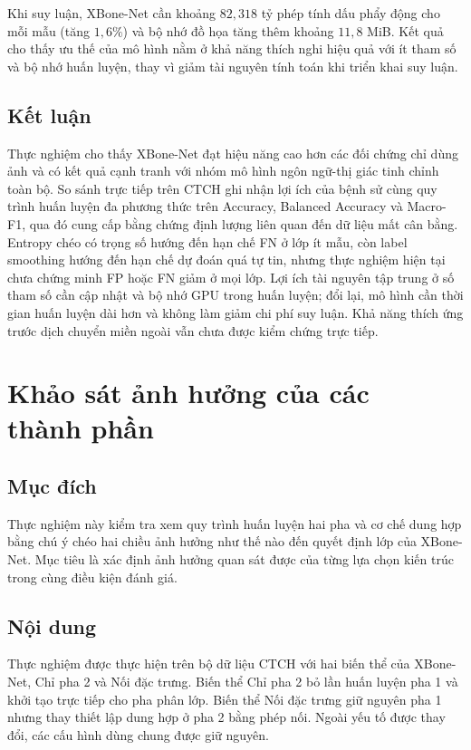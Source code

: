 Khi suy luận, XBone-Net cần khoảng $82{,}318$ tỷ phép tính dấu phẩy động cho mỗi mẫu (tăng $1{,}6\%$) và bộ nhớ đồ họa tăng thêm khoảng $11{,}8$ MiB. Kết quả cho thấy ưu thế của mô hình nằm ở khả năng thích nghi hiệu quả với ít tham số và bộ nhớ huấn luyện, thay vì giảm tài nguyên tính toán khi triển khai suy luận.

\subsection{Kết luận}
Thực nghiệm cho thấy XBone-Net đạt hiệu năng cao hơn các đối chứng chỉ dùng ảnh và có kết quả cạnh tranh với nhóm mô hình ngôn ngữ-thị giác tinh chỉnh toàn bộ. So sánh trực tiếp trên CTCH ghi nhận lợi ích của bệnh sử cùng quy trình huấn luyện đa phương thức trên Accuracy, Balanced Accuracy và Macro-F1, qua đó cung cấp bằng chứng định lượng liên quan đến dữ liệu mất cân bằng. Entropy chéo có trọng số hướng đến hạn chế FN ở lớp ít mẫu, còn label smoothing hướng đến hạn chế dự đoán quá tự tin, nhưng thực nghiệm hiện tại chưa chứng minh FP hoặc FN giảm ở mọi lớp. Lợi ích tài nguyên tập trung ở số tham số cần cập nhật và bộ nhớ GPU trong huấn luyện; đổi lại, mô hình cần thời gian huấn luyện dài hơn và không làm giảm chi phí suy luận. Khả năng thích ứng trước dịch chuyển miền ngoài vẫn chưa được kiểm chứng trực tiếp.

\pagebreak

\section[Khảo sát ảnh hưởng của các thành phần]{Khảo sát ảnh hưởng của các\\thành phần}
\label{sec:component_evaluation_results}

\subsection{Mục đích}
Thực nghiệm này kiểm tra xem quy trình huấn luyện hai pha và cơ chế dung hợp bằng chú ý chéo hai chiều ảnh hưởng như thế nào đến quyết định lớp của XBone-Net. Mục tiêu là xác định ảnh hưởng quan sát được của từng lựa chọn kiến trúc trong cùng điều kiện đánh giá.

\subsection{Nội dung}
Thực nghiệm được thực hiện trên bộ dữ liệu CTCH với hai biến thể của XBone-Net, Chỉ pha 2 và Nối đặc trưng. Biến thể Chỉ pha 2 bỏ lần huấn luyện pha 1 và khởi tạo trực tiếp cho pha phân lớp. Biến thể Nối đặc trưng giữ nguyên pha 1 nhưng thay thiết lập dung hợp ở pha 2 bằng phép nối. Ngoài yếu tố được thay đổi, các cấu hình dùng chung được giữ nguyên.
